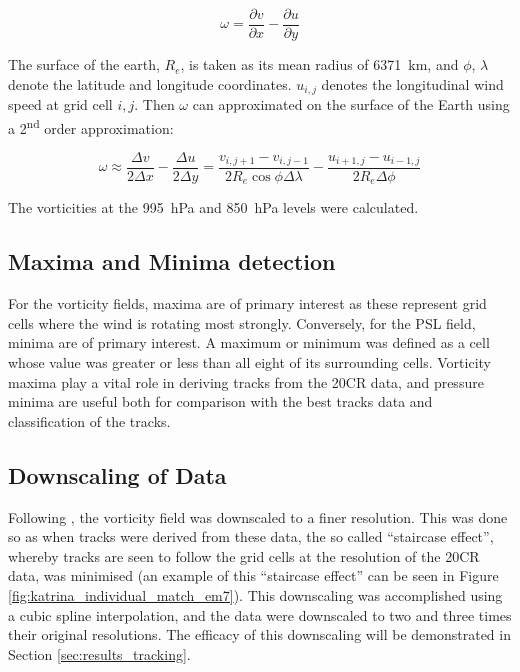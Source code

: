 \documentclass[pdftex,12pt,a4paper]{report}
\newcommand{\ts}{\textsuperscript}
\begin{document}
\begin{equation}
    \omega = \frac{\partial v}{\partial x} - \frac{\partial u}{\partial y}
    \label{eqn:vorticity}
\end{equation}

The surface of the earth, $R_e$, is taken as its mean radius of \SI{6371}{km}, and $\phi$, $\lambda$
denote the latitude and longitude coordinates. $u_{i, j}$ denotes the longitudinal wind speed at
grid cell $i, j$. Then $\omega$ can approximated on the surface of the Earth using a 2\ts{nd} order
approximation: %


\begin{equation}
    \omega \approx \frac{\Delta v}{2 \Delta x} - \frac{\Delta u}{2 \Delta y} = \frac{v_{i,j+1} - v_{i,j-1}}{2 R_e \cos{\phi} \Delta \lambda} - \frac{u_{i+1,j} - u_{i-1,j}}{2 R_e \Delta \phi }
    \label{eqn:vorticity_2nd_order}
\end{equation}

The vorticities at the \SI{995}{hPa} and \SI{850}{hPa} levels were calculated.

\subsection{Maxima and Minima detection}
\label{sec:methods_maxima_minima}

For the vorticity fields, maxima are of primary interest as these represent grid cells where the
wind is rotating most strongly. Conversely, for the PSL field, minima are of primary interest. A
maximum or minimum was defined as a cell whose value was greater or less than all eight of its
surrounding cells. Vorticity maxima play a vital role in deriving tracks from the 20CR data, and
pressure minima are useful both for comparison with the best tracks data and classification of the
tracks.

\subsection{Downscaling of Data}

Following \textcite{TODOCITEhodgesXXX}, the vorticity field was downscaled to a finer resolution. This was
done so as when tracks were derived from these data, the so called ``staircase effect'', whereby
tracks are seen to follow the grid cells at the resolution of the 20CR data, was minimised (an
example of this ``staircase effect'' can be seen in Figure \ref{fig:katrina_individual_match_em7}). This
downscaling was accomplished using a cubic spline interpolation, and the data were downscaled to two and
three times their original resolutions. The efficacy of this downscaling will be demonstrated in
Section \ref{sec:results_tracking}.
\end{document}
